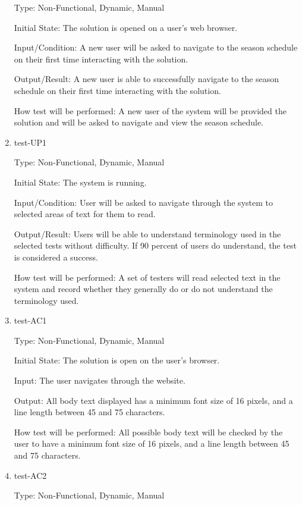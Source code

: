 \documentclass[12pt, titlepage]{article}
\begin{document}
\begin{enumerate}
  Type: Non-Functional, Dynamic, Manual

  Initial State: The solution is opened on a user's web browser.

  Input/Condition: A new user will be asked to navigate to the season schedule on their first
  time interacting with the solution.

  Output/Result: A new user is able to successfully navigate to the season schedule on
  their first time interacting with the solution.

  How test will be performed: A new user of the system will be provided the solution and
  will be asked to navigate and view the season schedule.

  \item{test-UP1\\}

  Type: Non-Functional, Dynamic, Manual

  Initial State: The system is running.

  Input/Condition: User will be asked to navigate through the system to 
  selected areas of text for them to read.

  Output/Result: Users will be able to understand terminology used in
  the selected tests without difficulty. If 90 percent of users do understand,
  the test is considered a success.

  How test will be performed: A set of testers will read selected text
  in the system and record whether they generally do or do not 
  understand the terminology used. 

  \item{test-AC1\\}

  Type: Non-Functional, Dynamic, Manual

  Initial State: The solution is open on the user's browser.

  Input: The user navigates through the website. 

  Output: All body text displayed has a minimum font size of 16 
  pixels, and a line length between 45 and 75 characters.

  How test will be performed: All possible body text will be checked by 
  the user to have a minimum font size of 16 pixels, and a line length 
  between 45 and 75 characters.

  \item{test-AC2\\}

  Type: Non-Functional, Dynamic, Manual


\end{enumerate}
\end{document}
